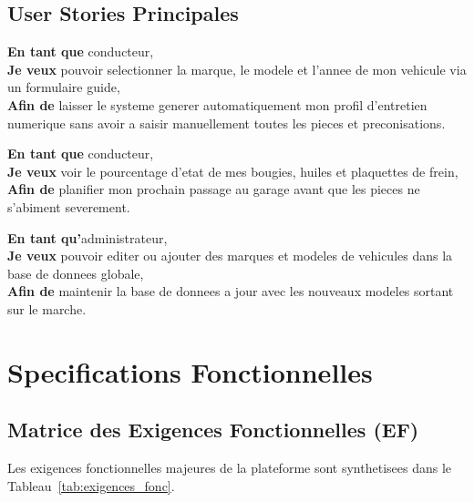 \documentclass[11pt,a4paper]{report}
\begin{document}
\section{User Stories Principales}
\begin{infoBox}
    \textbf{En tant que} conducteur, \\
    \textbf{Je veux} pouvoir selectionner la marque, le modele et l'annee de mon vehicule via un formulaire guide, \\
    \textbf{Afin de} laisser le systeme generer automatiquement mon profil d'entretien numerique sans avoir a saisir manuellement toutes les pieces et preconisations.
\end{infoBox}

\begin{infoBox}
    \textbf{En tant que} conducteur, \\
    \textbf{Je veux} voir le pourcentage d'etat de mes bougies, huiles et plaquettes de frein, \\
    \textbf{Afin de} planifier mon prochain passage au garage avant que les pieces ne s'abiment severement.
\end{infoBox}

\begin{infoBox}
    \textbf{En tant qu'}administrateur, \\
    \textbf{Je veux} pouvoir editer ou ajouter des marques et modeles de vehicules dans la base de donnees globale, \\
    \textbf{Afin de} maintenir la base de donnees a jour avec les nouveaux modeles sortant sur le marche.
\end{infoBox}

\chapter{Specifications Fonctionnelles}

\section{Matrice des Exigences Fonctionnelles (EF)}
Les exigences fonctionnelles majeures de la plateforme sont synthetisees dans le Tableau~\ref{tab:exigences_fonc}.
\end{document}
